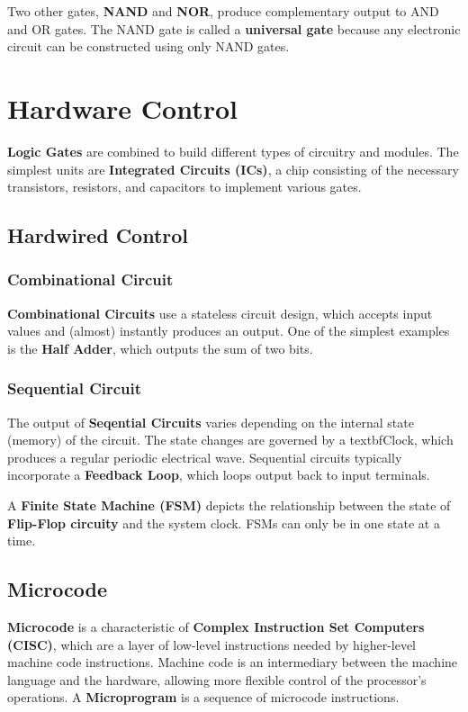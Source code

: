 \documentclass[pdftex,10pt]{article}
\begin{document}
Two other gates, \textbf{NAND} and \textbf{NOR}, produce complementary output to AND and OR gates. The NAND gate is called a \textbf{universal gate} because any electronic circuit can be constructed using only NAND gates.

\section{Hardware Control}

\textbf{Logic Gates} are combined to build different types of circuitry and modules. The simplest units are \textbf{Integrated Circuits (ICs)}, a chip consisting of the necessary transistors, resistors, and capacitors to implement various gates.

\subsection{Hardwired Control}
\subsubsection{Combinational Circuit}

\textbf{Combinational Circuits} use a stateless circuit design, which accepts input values and (almost) instantly produces an output. One of the simplest examples is the \textbf{Half Adder}, which outputs the sum of two bits.

\subsubsection{Sequential Circuit}

The output of \textbf{Seqential Circuits} varies depending on the internal state (memory) of the circuit. The state changes are governed by a textbf{Clock}, which produces a regular periodic electrical wave. Sequential circuits typically incorporate a \textbf{Feedback Loop}, which loops output back to input terminals.

A \textbf{Finite State Machine (FSM)} depicts the relationship between the state of \textbf{Flip-Flop circuity} and the system clock. FSMs can only be in one state at a time.

\subsection{Microcode}

\textbf{Microcode} is a characteristic of \textbf{Complex Instruction Set Computers (CISC)}, which are a layer of low-level instructions needed by higher-level machine code instructions. Machine code is an intermediary between the machine language and the hardware, allowing more flexible control of the processor's operations. A \textbf{Microprogram} is a sequence of microcode instructions.
\end{document}
